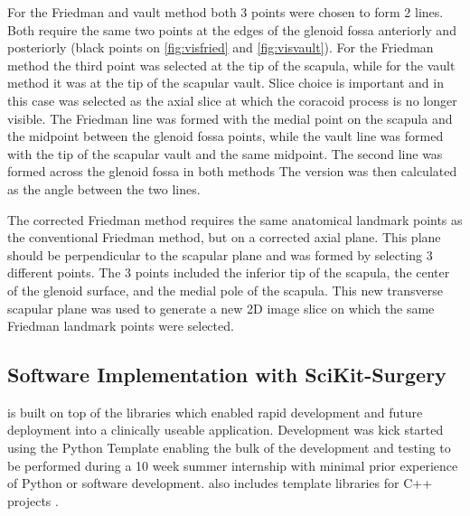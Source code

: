 For the Friedman and vault method both 3 points were chosen to form 2 lines. Both require the same two points at the edges of the glenoid fossa anteriorly and posteriorly (black points on \ref{fig:visfried} and \ref{fig:visvault}). For the Friedman method the third point was selected at the tip of the scapula, while for the vault method it was at the tip of the scapular vault. Slice choice is important and in this case was selected as the axial slice at which the coracoid process is no longer visible. The Friedman line was formed with the medial point on the scapula and the midpoint between the glenoid fossa points, while the vault line was formed with the tip of the scapular vault and the same midpoint. The second line was formed across the glenoid fossa in both methods The version was then calculated as the angle between the two lines.

The corrected Friedman method requires the same anatomical landmark points as the conventional Friedman method, but on a corrected axial plane. This plane should be perpendicular to the scapular plane and was formed by selecting 3 different points. The 3 points included the inferior tip of the scapula, the center of the glenoid surface, and the medial pole of the scapula. This new transverse scapular plane was used to generate a new 2D image slice on which the same Friedman landmark points were selected.

\subsection{Software Implementation with SciKit-Surgery}
\sksglenoid is built on top of the \sksurgery \cite{PMID:32436132} libraries which enabled
rapid development and future deployment into a clinically useable application. 
Development was kick started using the \sksurgery Python Template \cite{doel_tom_2022_5879146} enabling the bulk of the development and testing to be performed during a 10 week summer internship with minimal prior experience of Python or software development. \sksurgery also includes template libraries for C++ projects \cite{dowrick2021cmakecatchtemplate}.

